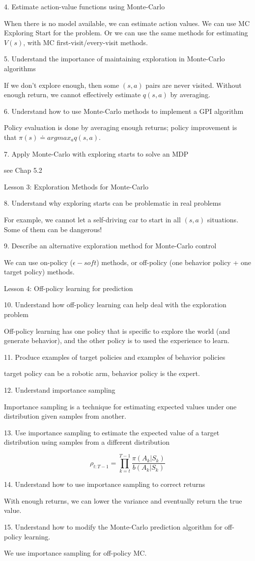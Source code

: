 \documentclass[sutton_barto_notes.tex]{subfiles}
\begin{document}
4. Estimate action-value functions using Monte-Carlo 

When there is no model available, we can estimate action values. We can use MC Exploring Start for the problem. Or we can use the same methods for estimating $V(s)$, with MC first-visit/every-visit methods.

5. Understand the importance of maintaining exploration in Monte-Carlo algorithms 

If we don't explore enough, then some $(s,a)$ pairs are never visited. Without enough return, we cannot effectively estimate $q(s,a)$ by averaging.

6. Understand how to use Monte-Carlo methods to implement a GPI algorithm

Policy evaluation is done by averaging enough returns; policy improvement is that $\pi(s) \doteq argmax_a q(s,a)$.

7. Apply Monte-Carlo with exploring starts to solve an MDP 

see Chap 5.2

Lesson 3: Exploration Methods for Monte-Carlo 

8. Understand why exploring starts can be problematic in real problems 

For example, we cannot let a self-driving car to start in all $(s,a)$ situations. Some of them can be dangerous!

9. Describe an alternative exploration method for Monte-Carlo control 

We can use on-policy ($\epsilon-soft$) methods, or off-policy (one behavior policy + one target policy) methods.

Lesson 4: Off-policy learning for prediction 

10. Understand how off-policy learning can help deal with the exploration problem 

Off-policy learning has one policy that is specific to explore the world (and generate behavior), and the other policy is to used the experience to learn.

11. Produce examples of target policies and examples of behavior policies

target policy can be a robotic arm, behavior policy is the expert.

12. Understand importance sampling

Importance sampling is a technique for estimating expected values under one distribution given samples from another. 

13. Use importance sampling to estimate the expected value of a target distribution using samples from a different distribution

$$ \rho_{t:T-1} = \prod_{k=t}^{T-1} \frac{\pi(A_k|S_k)}{b(A_k|S_k)} $$

14. Understand how to use importance sampling to correct returns 

With enough returns, we can lower the variance and eventually return the true value.

15. Understand how to modify the Monte-Carlo prediction algorithm for off-policy learning.

We use importance sampling for off-policy MC.
\end{document}

